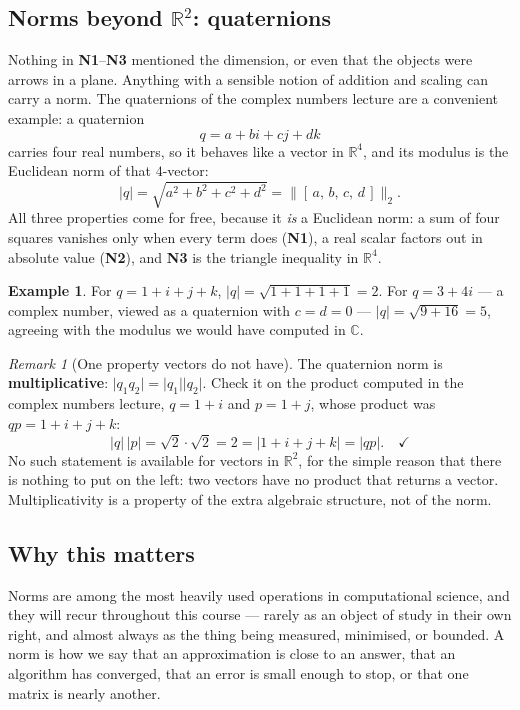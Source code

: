 \documentclass[11pt]{article}
\theoremstyle{definition}
\newtheorem{ex}{Example}
\theoremstyle{remark}
\newtheorem*{rmk}{Remark}
\newcommand{\R}{\mathbb{R}}
\begin{document}
\subsection{Norms beyond \texorpdfstring{$\R^{2}$}{R2}: quaternions}
Nothing in \textbf{N1}--\textbf{N3} mentioned the dimension, or even that the
objects were arrows in a plane. Anything with a sensible notion of addition and
scaling can carry a norm. The quaternions of the complex numbers lecture are a
convenient example: a quaternion
\[
  q = a+bi+cj+dk
\]
carries four real numbers, so it behaves like a vector in $\R^{4}$, and its
modulus is the Euclidean norm of that $4$-vector:
\[
  \lvert q\rvert = \sqrt{a^{2}+b^{2}+c^{2}+d^{2}}
  = \bigl\lVert [\,a,\,b,\,c,\,d\,]\bigr\rVert_2 .
\]
All three properties come for free, because it \emph{is} a Euclidean norm: a sum
of four squares vanishes only when every term does (\textbf{N1}), a real scalar
factors out in absolute value (\textbf{N2}), and \textbf{N3} is the triangle
inequality in $\R^{4}$.

\begin{ex}
For $q=1+i+j+k$, $\lvert q\rvert=\sqrt{1+1+1+1}=2$. For $q=3+4i$ --- a complex
number, viewed as a quaternion with $c=d=0$ --- $\lvert q\rvert=\sqrt{9+16}=5$,
agreeing with the modulus we would have computed in $\mathbb{C}$.
\end{ex}

\begin{rmk}[One property vectors do not have]
The quaternion norm is \textbf{multiplicative}:
$\lvert q_1q_2\rvert=\lvert q_1\rvert\lvert q_2\rvert$. Check it on the product
computed in the complex numbers lecture, $q=1+i$ and $p=1+j$, whose product was
$qp=1+i+j+k$:
\[
  \lvert q\rvert\,\lvert p\rvert = \sqrt2\cdot\sqrt2 = 2
  = \lvert 1+i+j+k\rvert = \lvert qp\rvert . \quad\checkmark
\]
No such statement is available for vectors in $\R^{2}$, for the simple reason
that there is nothing to put on the left: two vectors have no product that
returns a vector. Multiplicativity is a property of the extra algebraic
structure, not of the norm.
\end{rmk}

\subsection{Why this matters}
Norms are among the most heavily used operations in computational science, and
they will recur throughout this course --- rarely as an object of study in their
own right, and almost always as the thing being measured, minimised, or bounded.
A norm is how we say that an approximation is close to an answer, that an
algorithm has converged, that an error is small enough to stop, or that one
matrix is nearly another.
\end{document}
